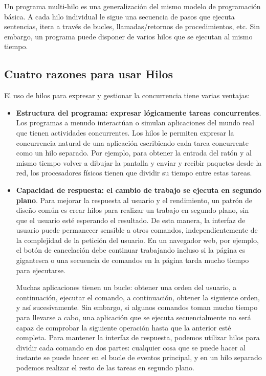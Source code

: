 \documentclass[10pt]{book}
\begin{document}
Un programa multi-hilo es una generalización del mismo modelo de programación básica. A cada hilo individual le sigue una secuencia de pasos que ejecuta sentencias, itera a través de bucles, llamadas/retornos de procedimientos, etc. Sin embargo, un programa puede disponer de varios hilos que se ejecutan al mismo tiempo.

\subsection{Cuatro razones para usar Hilos}
El uso de hilos para expresar y gestionar la concurrencia tiene varias ventajas:
\begin{itemize}
\item \textbf{Estructura del programa: expresar lógicamente tareas concurrentes}. Los programas a menudo interactúan o simulan aplicaciones del mundo real que tienen actividades concurrentes. Los hilos le permiten expresar la concurrencia natural de una aplicación escribiendo cada tarea concurrente como un hilo separado. Por ejemplo, para obtener la entrada del ratón y al mismo tiempo volver a dibujar la pantalla y enviar y recibir paquetes desde la red, los procesadores físicos tienen que dividir su tiempo entre estas tareas.

\item \textbf{Capacidad de respuesta: el cambio de trabajo se ejecuta en segundo plano}. Para mejorar la respuesta al usuario y el rendimiento, un patrón de diseño común es crear hilos para realizar un trabajo en segundo plano, sin que el usuario esté esperando el resultado. De esta manera, la interfaz de usuario puede permanecer sensible a otros comandos, independientemente de la complejidad de la petición del usuario. En un navegador web, por ejemplo, el botón de cancelación debe continuar trabajando incluso si la página es gigantesca o una secuencia de comandos en la página tarda mucho tiempo para ejecutarse.

Muchas aplicaciones tienen un bucle: obtener una orden del usuario, a continuación, ejecutar el comando, a continuación, obtener la siguiente orden, y así sucesivamente. Sin embargo, si algunos comandos toman mucho tiempo para llevarse a cabo, una aplicación que se ejecuta secuencialmente no será capaz de comprobar la siguiente operación hasta que la anterior esté completa. Para mantener la interfaz de respuesta, podemos utilizar hilos para dividir cada comando en dos partes: cualquier cosa que se puede hacer al instante se puede hacer en el bucle de eventos principal, y en un hilo separado podemos realizar el resto de las tareas en segundo plano.


\end{itemize}
\end{document}
